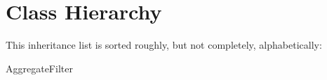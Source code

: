 \section{Class Hierarchy}
This inheritance list is sorted roughly, but not completely, alphabetically\+:\begin{DoxyCompactList}
\item Aggregate\+Filter\begin{DoxyCompactList}
\item {}
\end{DoxyCompactList}
\end{DoxyCompactList}
